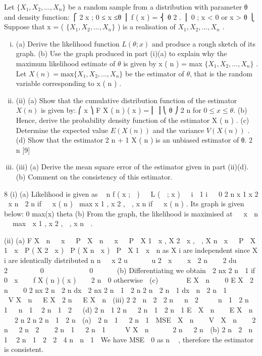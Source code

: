 \documentclass[a4paper,12pt]{article}
\begin{document}
\begin{enumerate}

Let $\{X_1 , X_2 , \ldots , X_n\}$ be a random sample from a distribution with parameter θ and
density function:
⎧ 2 x
; 0 ≤ x ≤θ
⎪
f ( x ) = ⎨ θ 2
.
⎪ 0
; x < 0 or x > θ
⎩
Suppose that x = ( $\{X_1 , X_2 , \ldots , X_n\}$ ) is a realisation of $X_1 , X_2 , \ldots , X_n$ .
\begin{enumerate}[(i)]
\item (a) Derive the likelihood function $L(\theta; x)$ and produce a rough sketch of its graph.
(b) Use the graph produced in part (i)(a) to explain why the maximum likelihood estimate of $\theta$ is given by x ( n ) = max{ $\{X_1 , X_2 , \ldots , X_n\}$ } .
Let $X ( n ) = \mbox{max}\{ X_1 , X_2 , \ldots , X_n\}$ be the estimator of $\theta$, that is the random variable corresponding to x ( n ) .
\item (ii)
(a)
Show that the cumulative distribution function of the estimator $X ( n )$ is
given by:
⎛ x ⎞
F X ( n ) ( x ) = ⎜ ⎟
⎝ θ ⎠
2 n
for $0 \leq x \leq \theta$.
(b) Hence, derive the probability density function of the estimator X ( n ) .
(c) Determine the expected value $E ( X ( n ) )$ and the variance $V ( X ( n ) )$ .
(d) Show that the estimator
2 n + 1
X ( n ) is an unbiased estimator of θ.
2 n
[9]
\item (iii)
(a) Derive the mean square error of the estimator given in part (ii)(d).
(b) Comment on the consistency of this estimator.

\end{enumerate}
\newpage

8
(i)
(a)
Likelihood is given as
 n f ( x ;  ) 

L (  ; x )   i  1 i
  0
2 n x 1 x 2  x n
 2 n
if   x ( n )  max{ x 1 , x 2 ,  , x n }
if   x ( n ) .
Its graph is given below:
0
max(x)
theta
(b)
From the graph, the likelihood is maximised at
  x  n   max  x 1 , x 2 ,  , x n  .

(ii)
(a)
F X
 n 
 x   P  X  n   x   P  X 1  x , X 2  x ,  , X n  x 
 P  X 1  x  P ( X 2  x )  P ( X n  x )
 P  X 1  x  n
as X i are independent
since X i are identically distributed
n
n
  x 2 u      u 2  x    x  2 n
   2 du     2     
  0 
         0     
(b)
Differentiating we obtain
 2 nx 2 n  1
if 0  x  

f X ( n ) ( x )    2 n
 0
otherwise

(c)
  
  
E X  n   
0
E X  2 n   
0
2 nx 2 n

2 n
dx 
2 nx 2 n  1
 2 n
2 n 
2 n  1
dx 
n  2
n  1
       
V X  n   E X  2 n   E X  n 
(iii)
2
2

n  2  2 n  
n  2
 


n  1  2 n  1 
 n  1  2 n  1  2
 
(d) 2 n  1 2 n 
 2 n  1
 2 n  1
E 
X  n   
E X  n  

2 n
2 n 2 n  1
 2 n

(a)  2 n  1

 2 n  1

MSE 
X  n    V 
X  n  
 2 n

 2 n

2
 
 2 n  1 
 2 n  1 
 
 V X  n   

 2 n 
 2 n 
(b)
2
n  2
 n  1  2 n  1  2
 2

4 n  n  1 
We have MSE  0 as n  , therefore the estimator is consistent.


\end{enumerate}
\end{document}
